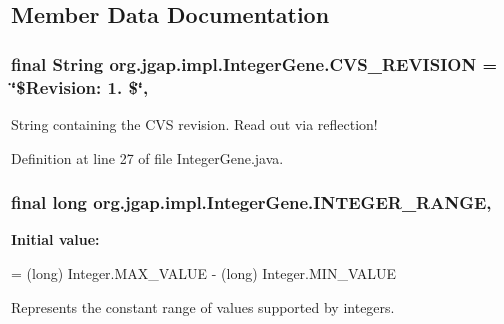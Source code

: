 \subsection{Member Data Documentation}
\hypertarget{classorg_1_1jgap_1_1impl_1_1_integer_gene_a55f3d782c94e8002b3e52de15f0e3ae0}{
\subsubsection[{C\-V\-S\-\_\-\-R\-E\-V\-I\-S\-I\-O\-N}]{\setlength{\rightskip}{0pt plus 5cm}final String org.\-jgap.\-impl.\-Integer\-Gene.\-C\-V\-S\-\_\-\-R\-E\-V\-I\-S\-I\-O\-N = \char`\"{}\$Revision\-: 1. \$\char`\"{}\hspace{0.3cm}{\ttfamily [static]}, {\ttfamily [private]}}}\label{classorg_1_1jgap_1_1impl_1_1_integer_gene_a55f3d782c94e8002b3e52de15f0e3ae0}
String containing the C\-V\-S revision. Read out via reflection! 

Definition at line 27 of file Integer\-Gene.\-java.

\hypertarget{classorg_1_1jgap_1_1impl_1_1_integer_gene_a91bfa275e9a9ba43b6cab6f368aa1526}{
\subsubsection[{I\-N\-T\-E\-G\-E\-R\-\_\-\-R\-A\-N\-G\-E}]{\setlength{\rightskip}{0pt plus 5cm}final long org.\-jgap.\-impl.\-Integer\-Gene.\-I\-N\-T\-E\-G\-E\-R\-\_\-\-R\-A\-N\-G\-E\hspace{0.3cm}{\ttfamily [static]}, {\ttfamily [protected]}}}\label{classorg_1_1jgap_1_1impl_1_1_integer_gene_a91bfa275e9a9ba43b6cab6f368aa1526}
{\bfseries Initial value\-:}
\begin{DoxyCode}
= (long) Integer.MAX\_VALUE
      - (\textcolor{keywordtype}{long}) Integer.MIN\_VALUE
\end{DoxyCode}
Represents the constant range of values supported by integers. 

